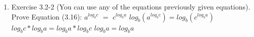\documentclass[12pt]{article}
\begin{document}
\begin{enumerate}
\item Exercise 3.2-2 (You can use any of the equations previously given equations). 
\newline Prove Equation (3.16): $a^{{log_b}c}$ $=$ $c^{{log_b}a}$
\newline $log_b(a^{{log_b}c}) = log_b(c^{{log_b}a})$
\newline $log_bc * log_ba = log_ba * log_bc$
\newline $log_ba = log_ba$
\end{enumerate}
 

 
\end{document}
